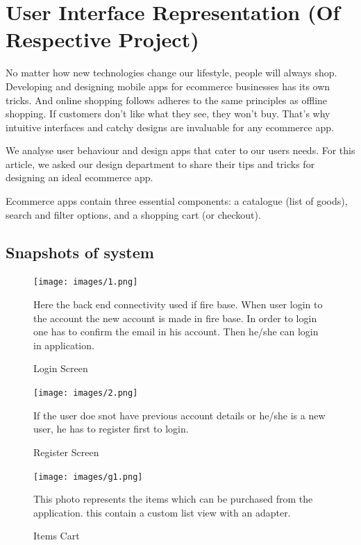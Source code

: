 \section{User Interface Representation (Of  Respective Project)}
No matter how new technologies change our lifestyle, people will always shop. Developing and designing mobile apps for ecommerce businesses has its own tricks. And online shopping follows adheres to the same principles as offline shopping. If customers don’t like what they see, they won’t buy. That’s why intuitive interfaces and catchy designs are invaluable for any ecommerce app.

We analyse user behaviour and design apps that cater to our users needs. For this article, we asked our design department to share their tips and tricks for designing an ideal ecommerce app.

Ecommerce apps contain three essential components: a catalogue (list of goods), search and filter options, and a shopping cart (or checkout).

\subsection{Snapshots of system}


\begin{figure}[ht]
\centering
\texttt{[image: images/1.png]}
\caption{Login Screen}

Here the back end connectivity used if fire base. When user login to the account the new account is made in fire base. In order to login one has to confirm the email in his account. Then he/she can login in application.

\end{figure}

\newpage

\begin{figure}[ht]
\centering
\texttt{[image: images/2.png]}
\caption{Register Screen}

If the user doe snot have previous account details or he/she is a new user, he has to register first to login.

\end{figure}

\newpage

\begin{figure}[ht]
\centering
\texttt{[image: images/g1.png]}
\caption{Items Cart}

This photo represents the items which can be purchased from the application. this contain a custom list view with an adapter.

\end{figure}

